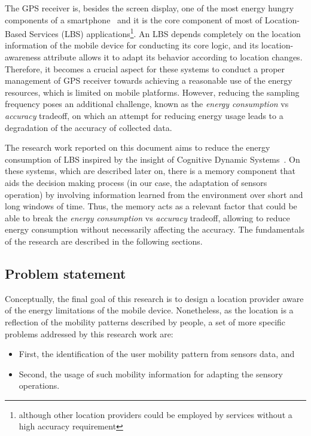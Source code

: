 \documentclass[ENG,PhD]{cinvestav}
\begin{document}
The GPS receiver is, besides the screen display, one of the most energy hungry components of a smartphone~\cite{Perez-Torres2016} and it is the core component of most of Location-Based Services (LBS) applications\footnote{although other location providers could be employed by services without a high accuracy requirement}.
An LBS depends completely on the location information of the mobile device for conducting its core logic, and its location-awareness attribute allows it to adapt its behavior according to location changes.
Therefore, it becomes a crucial aspect for these systems to conduct a proper management of GPS receiver towards achieving a reasonable use of the energy resources, which is limited on mobile platforms.
However, reducing the sampling frequency poses an additional challenge, known as the \emph{energy consumption} vs \emph{accuracy} tradeoff, on which an attempt for reducing energy usage leads to a degradation of the accuracy of collected data.

The research work reported on this document aims to reduce the energy consumption of LBS inspired by the insight of Cognitive Dynamic Systems~\cite{Haykin2006}.
On these systems, which are described later on, there is a memory component that aids the decision making process (in our case, the adaptation of sensors operation) by involving information learned from the environment over short and long windows of time.
Thus, the memory acts as a relevant factor that could be able to break the \emph{energy consumption} vs \emph{accuracy} tradeoff, allowing to reduce energy consumption without necessarily affecting the accuracy.
The fundamentals of the research are described in the following sections.


\subsection{Problem statement}
Conceptually, the final goal of this research is to design a location provider aware of the energy limitations of the mobile device.
Nonetheless, as the location is a reflection of the mobility patterns described by people, a set of more specific problems addressed by this research work are:
\begin{itemize}
  \item First, the identification of the user mobility pattern from sensors data, and
  \item Second, the usage of such mobility information for adapting the sensory operations.
\end{itemize}
\end{document}
